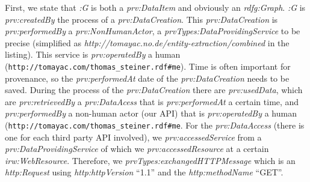\documentclass[twocolumn]{article}
\begin{document}
First, we state that \emph{:G} is both a \emph{prv:DataItem} and obviously an \emph{rdfg:Graph}. \emph{:G} is \emph{prv:createdBy} the process of a \emph{prv:DataCreation}. This \emph{prv:DataCreation} is \emph{prv:performedBy} a \emph{prv:NonHumanActor}, a \emph{prvTypes:DataProvidingService} to be precise (simplified as \emph{http://tomayac.no.de/entity-extraction/combined} in the listing). This service is \emph{prv:operatedBy} a human (\texttt{http://tomayac.com/thomas\_steiner.rdf\#me}). Time is often important for provenance, so the \emph{prv:performedAt} date of the \emph{prv:DataCreation} needs to be saved. During the process of the \emph{prv:DataCreation} there are \emph{prv:usedData}, which are \emph{prv:retrievedBy} a \emph{prv:DataAcess} that is \emph{prv:performedAt} a certain time, and \emph{prv:performedBy} a non-human actor (our API) that is \emph{prv:operatedBy} a human (\texttt{http://tomayac.com/thomas\_steiner.rdf\#me}. For the \emph{prv:DataAccess} (there is one for each third party API involved), we \emph{prv:accessedService} from a \emph{prv:DataProvidingService} of which we \emph{prv:accessedResource} at a certain \emph{irw:WebResource}. Therefore, we \emph{prvTypes:exchangedHTTPMessage} which is an \emph{http:Request} using \emph{http:httpVersion} ``1.1'' and the \emph{http:methodName} ``GET''.
\end{document}

